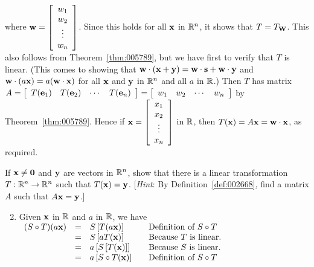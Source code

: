 \begin{multicols}{2}
\begin{ex}
\begin{sol}
\begin{enumerate}[label={\alph*.}]
where $\textbf{w} = \left[ \begin{array}{c}
w_{1} \\
w_{2} \\
\vdots \\
w_{n} \\
\end{array} \right]$.
 Since this holds for all $\textbf{x}$ in $\mathbb{R}^n$, it shows that $T = T_{\textbf{W}}$. This also follows from Theorem~\ref{thm:005789}, but we have first to verify that $T$ is linear. (This comes to showing that $\textbf{w} \cdot (\textbf{x} + \textbf{y}) = \textbf{w} \cdot \textbf{s} + \textbf{w} \cdot \textbf{y}$ and $\textbf{w} \cdot (a\textbf{x}) = a(\textbf{w} \cdot \textbf{x})$ for all $\textbf{x}$ and $\textbf{y}$ in $\mathbb{R}^n$ and all $a$ in $\mathbb{R}$.) Then $T$ has matrix $A = \left[ \begin{array}{cccc}
 T(\textbf{e}_{1}) & T(\textbf{e}_{2}) & \cdots & T(\textbf{e}_{n})
 \end{array} \right] = \left[ \begin{array}{cccc}
 w_{1} & w_{2} & \cdots & w_{n}
 \end{array} \right]$ by Theorem~\ref{thm:005789}. Hence if $\textbf{x} = \left[ \begin{array}{c}
 x_{1} \\
 x_{2} \\
 \vdots \\
 x_{n}
 \end{array} \right]$ in $\mathbb{R}$, then $T(\textbf{x}) = A\textbf{x} = \textbf{w} \cdot \textbf{x}$, as required.
\end{enumerate}
\end{sol}
\end{ex}

\begin{ex}
If $\textbf{x} \neq \textbf{0}$ and $\textbf{y}$ are vectors in $\mathbb{R}^n$, show that there is a linear transformation $T : \mathbb{R}^n \to \mathbb{R}^n$ such that $T(\textbf{x}) = \textbf{y}$. [\textit{Hint}: By Definition~\ref{def:002668}, find a matrix $A$ such that $A\textbf{x} = \textbf{y}$.]

\begin{sol}
\begin{enumerate}[label={\alph*.}]
\setcounter{enumi}{1}
\item  Given $\textbf{x}$ in $\mathbb{R}$ and $a$ in $\mathbb{R}$, we have \\

\hspace*{-3em}$\begin{array}{lllll}
(S \circ T)(a\textbf{x}) & = & S\left[T(a\textbf{x})\right] & & \mbox{Definition of } S \circ T \\
& = & S\left[aT(\textbf{x})\right] & & \mbox{Because } T \mbox{ is linear.} \\
& = & a\left[S\left[T(\textbf{x})\right]\right] & & \mbox{Because } S \mbox{ is linear.} \\
& = & a\left[S \circ T(\textbf{x})\right]& & \mbox{Definition of } S \circ T \\
\end{array}$


\end{enumerate}
\end{sol}
\end{ex}
\end{multicols}

